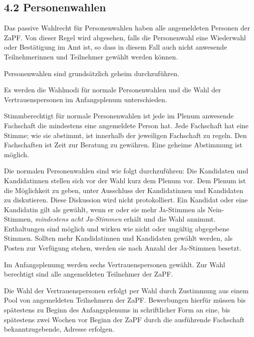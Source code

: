 \documentclass[12pt,oneside]{scrartcl}
\begin{document}
\subsection{4.2 Personenwahlen%
  \label{personenwahlen}%
}
\setcounter{listcnt0}{0}
\begin{list}{.}
{
\setlength{\rightmargin}{\leftmargin}
}

\item Das passive Wahlrecht für Personenwahlen haben alle angemeldeten Personen
der ZaPF. Von dieser Regel wird abgesehen, falls die Personenwahl eine
Wiederwahl oder Bestätigung im Amt ist, so dass in diesem Fall auch nicht
anwesende Teilnehmerinnen und Teilnehmer gewählt werden können.

\item Personenwahlen sind grundsätzlich geheim durchzuführen.

\item Es werden die Wahlmodi für normale Personenwahlen und die Wahl der
Vertrauenspersonen im Anfangsplenum unterschieden.

\item Stimmberechtigt für normale Personenwahlen ist jede im Plenum anwesende
Fachschaft die mindestens eine angemeldete Person hat.
Jede Fachschaft hat eine Stimme; wie sie abstimmt, ist innerhalb der
jeweiligen Fachschaft zu regeln.
Den Fachschaften ist Zeit zur Beratung zu gewähren.
Eine geheime Abstimmung ist möglich.

\item Die normalen Personenwahlen sind wie folgt durchzuführen:
Die Kandidaten und Kandidatinnen stellen sich vor der Wahl kurz dem
Plenum vor.
Dem Plenum ist die Möglichkeit zu geben, unter Ausschluss der Kandidatinnen
und Kandidaten zu diskutieren.
Diese Diskussion wird nicht protokolliert.
Ein Kandidat oder eine Kandidatin gilt als gewählt, wenn er oder sie mehr
Ja-Stimmen als Nein-Stimmen, \emph{mindestens acht Ja-Stimmen}
erhält und die Wahl annimmt.
Enthaltungen sind möglich und wirken wie nicht oder ungültig abgegebene
Stimmen.
Sollten mehr Kandidatinnen und Kandidaten gewählt werden, als Posten zur
Verfügung stehen, werden sie nach Anzahl der Ja-Stimmen besetzt.

\item Im Anfangsplenumg werden sechs Vertrauenspersonen gewählt. Zur Wahl
berechtigt sind alle angemeldeten Teilnehmer der ZaPF.

\item Die Wahl der Vertrauenspersonen erfolgt per Wahl durch
Zustimmung aus einem Pool von angemeldeten Teilnehmern der ZaPF.
Bewerbungen hierfür müssen bis spätestens zu Beginn des Anfangsplenums
in schriftlicher Form an eine, bis spätestens zwei Wochen vor Beginn der
ZaPF durch die ausführende Fachschaft bekanntzugebende, Adresse erfolgen.


\end{list}
\end{document}
